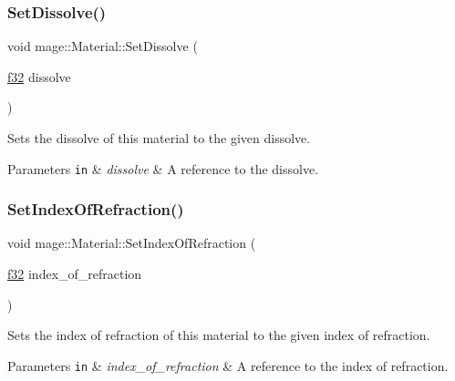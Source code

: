 \subsubsection{\texorpdfstring{Set\+Dissolve()}{SetDissolve()}}
{\footnotesize\ttfamily void mage\+::\+Material\+::\+Set\+Dissolve (\begin{DoxyParamCaption}\item[{\hyperlink{namespacemage_a6a44ad388483959dc4dff9f2aef91431}{f32}}]{dissolve }\end{DoxyParamCaption})\hspace{0.3cm}{\ttfamily [noexcept]}}

Sets the dissolve of this material to the given dissolve.


\begin{DoxyParams}[1]{Parameters}
\mbox{\tt in}  & {\em dissolve} & A reference to the dissolve. \\
\hline
\end{DoxyParams}
\hypertarget{structmage_1_1_material_a0e8085ce5fc0d6b523d269a6d2d1f334}{}\label{structmage_1_1_material_a0e8085ce5fc0d6b523d269a6d2d1f334} 
\subsubsection{\texorpdfstring{Set\+Index\+Of\+Refraction()}{SetIndexOfRefraction()}}
{\footnotesize\ttfamily void mage\+::\+Material\+::\+Set\+Index\+Of\+Refraction (\begin{DoxyParamCaption}\item[{\hyperlink{namespacemage_a6a44ad388483959dc4dff9f2aef91431}{f32}}]{index\+\_\+of\+\_\+refraction }\end{DoxyParamCaption})\hspace{0.3cm}{\ttfamily [noexcept]}}

Sets the index of refraction of this material to the given index of refraction.


\begin{DoxyParams}[1]{Parameters}
\mbox{\tt in}  & {\em index\+\_\+of\+\_\+refraction} & A reference to the index of refraction. \\
\hline
\end{DoxyParams}
\hypertarget{structmage_1_1_material_a9b0bcb448cf9c96bcb63dcbc0f110bd1}{}\label{structmage_1_1_material_a9b0bcb448cf9c96bcb63dcbc0f110bd1} 
